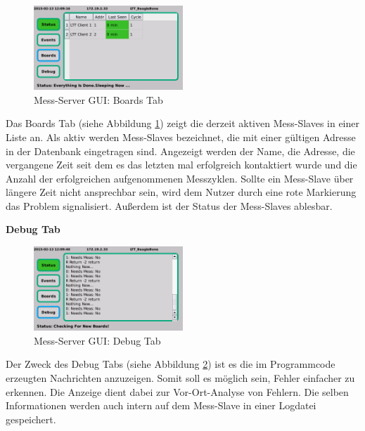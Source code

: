 \begin{figure}[H]
\begin{center}
\includegraphics[width=0.5\textwidth ]{img/GUI/Server_GUI_Boards1.png}
\caption{Mess-Server GUI: Boards Tab}
\label{figure_MessServerGUIBoards}
\end{center}
\end{figure}

Das Boards Tab (siehe Abbildung \ref{figure_MessServerGUIBoards}) zeigt die derzeit aktiven Mess-Slaves in einer Liste an. Als aktiv werden Mess-Slaves bezeichnet, die mit einer gültigen Adresse in der Datenbank eingetragen sind. Angezeigt werden der Name, die Adresse, die vergangene Zeit seit dem es das letzten mal erfolgreich kontaktiert wurde und die Anzahl der erfolgreichen aufgenommenen Messzyklen. Sollte ein Mess-Slave über längere Zeit nicht ansprechbar sein, wird dem Nutzer durch eine rote Markierung das Problem signalisiert. Außerdem ist der Status der Mess-Slaves ablesbar.

\textbf{Debug Tab}

\begin{figure}[H]
\begin{center}
\includegraphics[width=0.5\textwidth ]{img/GUI/Server_GUI_Debug2.png}
\caption{Mess-Server GUI: Debug Tab}
\label{figure_MessServerGUIDebug}
\end{center}
\end{figure}

Der Zweck des Debug Tabs (siehe Abbildung \ref{figure_MessServerGUIDebug}) ist es die im Programmcode erzeugten Nachrichten anzuzeigen. Somit soll es möglich sein, Fehler einfacher zu erkennen. Die Anzeige dient dabei zur Vor-Ort-Analyse von Fehlern. Die selben Informationen werden auch intern auf dem Mess-Slave in einer Logdatei gespeichert.


